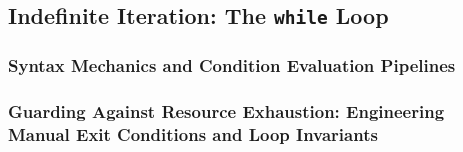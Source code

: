 \subsection{Indefinite Iteration: The \texttt{while} Loop}
\subsubsection{Syntax Mechanics and Condition Evaluation Pipelines}
\subsubsection{Guarding Against Resource Exhaustion: Engineering Manual Exit Conditions and Loop Invariants}

